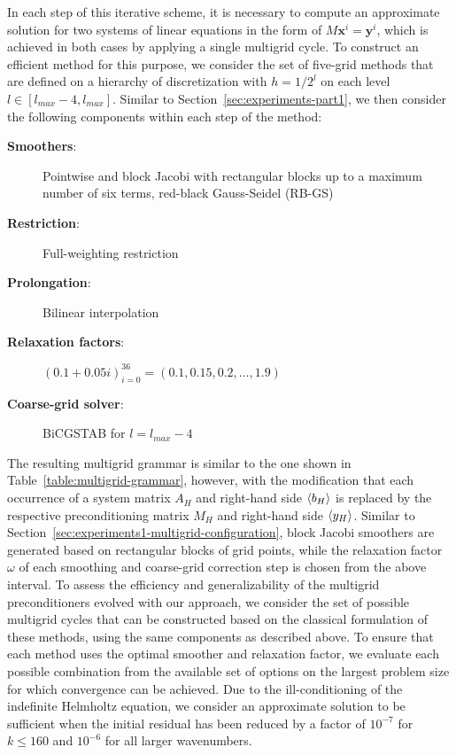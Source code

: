 In each step of this iterative scheme, it is necessary to compute an approximate solution for two systems of linear equations in the form of $M \bm{x}^i = \bm{y}^i$, %
which is achieved in both cases by applying a single multigrid cycle.
To construct an efficient method for this purpose, we consider the set of five-grid methods that are defined on a hierarchy of discretization with $h = 1/2^{l}$ on each level $l \in \left[l_{max} - 4,l_{max}\right]$. 
Similar to Section~\ref{sec:experiments-part1}, we then consider the following components within each step of the method:
\begin{description}
	\item[\textbf{Smoothers}:] Pointwise and block Jacobi with rectangular blocks up to a maximum number of six terms, red-black Gauss-Seidel (RB-GS)
	\item[\textbf{Restriction}:] Full-weighting restriction
	\item[\textbf{Prolongation}:] Bilinear interpolation
	\item[\textbf{Relaxation factors}:] $\left( 0.1 + 0.05i \right)_{i = 0}^{36} = \left(0.1, 0.15, 0.2, \dots, 1.9 \right)$
	\item[\textbf{Coarse-grid solver}:] BiCGSTAB for $l = l_{max} - 4$
\end{description}
The resulting multigrid grammar is similar to the one shown in Table~\ref{table:multigrid-grammar}, however, with the modification that each occurrence of a system matrix $A_H$ and right-hand side $\langle b_H \rangle$ is replaced by the respective preconditioning matrix $M_H$ and right-hand side $\langle y_H \rangle$.
Similar to Section~\ref{sec:experiments1-multigrid-configuration}, block Jacobi smoothers are generated based on rectangular blocks of grid points, while the relaxation factor $\omega$ of each smoothing and coarse-grid correction step is chosen from the above interval.
To assess the efficiency and generalizability of the multigrid preconditioners evolved with our approach, we consider the set of possible multigrid cycles that can be constructed based on the classical formulation of these methods, using the same components as described above.
To ensure that each method uses the optimal smoother and relaxation factor, we evaluate each possible combination from the available set of options on the largest problem size for which convergence can be achieved.
Due to the ill-conditioning of the indefinite Helmholtz equation, we consider an approximate solution to be sufficient when the initial residual has been reduced by a factor of $10^{-7}$ for $k \leq 160$ and $10^{-6}$ for all larger wavenumbers.

